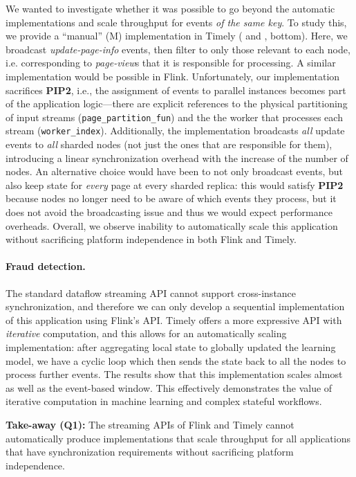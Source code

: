We wanted to investigate whether it was possible to go beyond the automatic implementations and scale throughput for events \emph{of the same key}.
To study this, we provide a ``manual'' (M) implementation in Timely ( and , bottom). Here, we broadcast \emph{update-page-info} events, then filter to only those relevant to each node, i.e. corresponding to \emph{page-view}s that it is responsible for processing. A similar implementation would be possible in Flink. Unfortunately, our implementation sacrifices \textbf{PIP2}, i.e., the assignment of events to parallel instances
becomes part of the application logic---there are explicit references to the physical partitioning of input streams
(\texttt{page\_partition\_fun}) and the the worker that processes each stream (\texttt{worker\_index}).
Additionally, the implementation broadcasts \emph{all} update events to \emph{all} sharded nodes (not just the ones that are responsible for them), introducing a linear synchronization overhead with the increase of the number of nodes.
An alternative choice would have been to not only broadcast events, but also keep state for \emph{every} page at every sharded replica: this would satisfy \textbf{PIP2} because nodes no longer need to be aware of which events they process, but it does not avoid the broadcasting issue and thus we would expect performance overheads.
Overall, we observe inability to automatically scale this application without sacrificing platform independence in both Flink and Timely.

\paragraph{Fraud detection.}
The standard dataflow streaming API cannot support cross-instance synchronization, and therefore we can only develop a sequential implementation of this application using Flink's API.
Timely offers a more expressive API with \emph{iterative} computation, and this allows for an automatically scaling implementation: after aggregating local state to globally updated the learning model, we have a cyclic loop which then sends the state back to all the nodes to process further events.
The results show that this implementation scales almost as well as the event-based window.
This effectively demonstrates the value of iterative computation in machine learning and complex stateful workflows.

\begin{takeaway}
\textbf{Take-away (Q1):}
The streaming APIs of Flink and Timely cannot automatically produce implementations that scale throughput for all applications that have synchronization requirements without sacrificing platform independence.
\end{takeaway}

